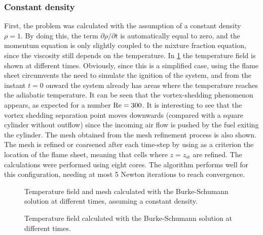\subsubsection{Constant density}
First, the problem was calculated with the assumption of a constant density $\rho = 1$. By doing this, the term $\partial\rho /\partial t$ is automatically equal to zero, and the momentum equation is only slightly coupled to the mixture fraction equation, since the viscosity still depends on the temperature. 
In \cref{fig:CombustionOverCylinder_CD} the temperature field is shown at different times. Obviously, since this is a simplified case, using the flame sheet circumvents the need to simulate the ignition of the system, and from the instant $t=0$ onward the system already has areas where the temperature reaches the adiabatic temperature. It can be seen that the vortex-shedding phenomenon appears, as expected for a number $ \text{Re} = 300$. It is interesting to see that the vortex shedding separation point moves downwards (compared with a square cylinder without outflow) since the incoming air flow is pushed by the fuel exiting the cylinder. The mesh obtained from the mesh refinement process is also shown. The mesh is refined or coarsened after each time-step by using as a criterion the location of the flame sheet, meaning that cells where $z = z_{\text{st}}$ are refined. The calculations were performed using eight cores.  The algorithm performs well for this configuration, needing at most 5 Newton iterations to reach convergence. %


\begin{figure}[h]
	\centering
	\par\bigskip%
	\par\bigskip%
	\caption{Temperature field and mesh calculated with the Burke-Schumann solution at different times, assuming a constant density.} \label{fig:CombustionOverCylinder_CD}
\end{figure}
\begin{figure}[p]
	\centering
	\par\bigskip%
	\par\bigskip%
	\caption{Temperature field calculated with the Burke-Schumann solution at different times.} \label{fig:CombustionOverCylinder}
\end{figure}

